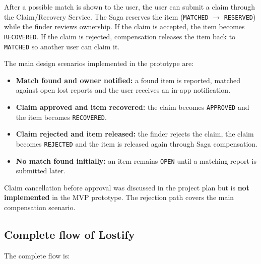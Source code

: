 \documentclass[11pt,a4paper]{article}
\begin{document}
After a possible match is shown to the user, the user can submit a claim through the Claim/Recovery
Service. The Saga reserves the item (\texttt{MATCHED} $\rightarrow$ \texttt{RESERVED}) while the finder
reviews ownership. If the claim is accepted, the item becomes \texttt{RECOVERED}. If the claim is
rejected, compensation releases the item back to \texttt{MATCHED} so another user can claim it.

The main design scenarios implemented in the prototype are:

\begin{itemize}
    \item \textbf{Match found and owner notified:} a found item is reported, matched against open lost
    reports and the user receives an in-app notification.
    \item \textbf{Claim approved and item recovered:} the claim becomes \texttt{APPROVED} and the item
    becomes \texttt{RECOVERED}.
    \item \textbf{Claim rejected and item released:} the finder rejects the claim, the claim becomes
    \texttt{REJECTED} and the item is released again through Saga compensation.
    \item \textbf{No match found initially:} an item remains \texttt{OPEN} until a matching report is
    submitted later.
\end{itemize}

Claim cancellation before approval was discussed in the project plan but is \textbf{not implemented}
in the MVP prototype. The rejection path covers the main compensation scenario.

\subsection{Complete flow of Lostify}

The complete flow is:
\end{document}
